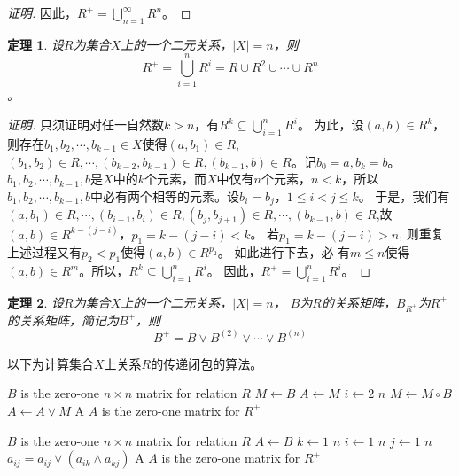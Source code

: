 \documentclass{article}
\newtheorem{Thm}{定理}
\begin{document}
\begin{CJK*}{UTF8}{gbsn}
\begin{proof}[证明]
    因此，$ R^+ = \bigcup_{n=1}^\infty R^n$。
  \end{proof}
  \begin{Thm}
    设$R$为集合$X$上的一个二元关系，$|X| = n$，则\[R^+ = \bigcup_{i=1}^nR^i = R \cup R^2  \cup \cdots \cup R^n \]。
  \end{Thm}
  \begin{proof}[证明]
      只须证明对任一自然数$k > n$，有$R^k \subseteq \bigcup_{i=1}^nR^i$。
      为此，设$(a,b) \in R^k$，则存在$b_1, b_2, \cdots, b_{k-1} \in
      X$使得$(a,b_1) \in R$, $(b_1, b_2) \in R, \cdots, (b_{k-2}, b_{k-1})\in R,
      (b_{k-1}, b) \in R$。记$b_0 = a, b_k = b$。  $b_1,b_2, \cdots,
      b_{k-1}, b$是$X$中的$k$个元素，而$X$中仅有$n$个元素，$n < k$，所以$b_1,
      b_2, \cdots, b_{k-1}, b$中必有两个相等的元素。设$b_i=b_j$，$1 \leq i < j
      \leq k$。  于是，我们有$(a,b_1)\in R, \cdots, (b_{i-1}, b_i)\in R,
      (b_j, b_{j+1})\in R, \cdots, (b_{k-1},b)\in R$,故$(a,b)\in
      R^{k-(j-i)}$，$p_1=k-(j-i) < k$。  若$p_1 = k - (j - i) > n$, 则重复
      上述过程又有$p_2 < p_1$使得$(a,b) \in R^{p_2}$。  如此进行下去，必
      有$m \leq n$使得$(a,b) \in R^m$。所以，$R^k \subseteq
      \bigcup_{i=1}^nR^i$。  因此，$R^+=\bigcup_{i=1}^nR^i$。
  \end{proof}

    \begin{Thm}
    设$R$为集合$X$上的一个二元关系，$|X| = n$， $B$为$R$的关系矩阵，$B_{R^+}$为$R^+$的关系矩阵，简记为$B^+$，则
    \begin{equation*}
      B^+ = B \lor B^{(2)} \lor \cdots \lor B^{(n)}
    \end{equation*}
  \end{Thm}

  以下为计算集合$X$上关系$R$的传递闭包的算法。
   \begin{codebox}
    \zi \Comment $B$ is the zero-one $n \times n$ matrix for relation $R$
    \li $M \gets B$
    \li $A \gets M$
    \li \For $i \gets 2$ \To $n$
    \li \Do
        $M \gets M \circ B$
    \li $A \gets A \lor M$
    \End
    \li \Return A \Comment $A$ is the zero-one matrix for $R^+$
  \end{codebox}
  \begin{codebox}
    \zi \Comment $B$ is the zero-one $n \times n$ matrix for relation $R$
    \li $A \gets B$
    \li \For $k \gets 1$ \To $n$
    \li \Do
    \For $i \gets 1$ \To $n$
    \li \Do
    \For $j \gets 1$ \To $n$
    \li \Do
    $a_{ij} = a_{ij} \lor (a_{ik} \land a_{kj})$
    \End
    \End
    \End
    \li \Return A \Comment $A$ is the zero-one matrix for $R^+$
  \end{codebox}  


\end{CJK*}
\end{document}
